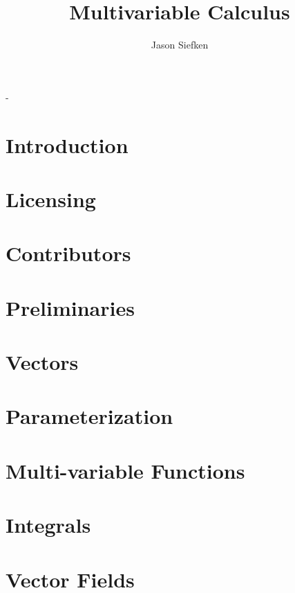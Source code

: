 \documentclass[letter, 11pt, onesided]{memoir}
\author{Jason Siefken}
\title{Multivariable Calculus}
\numberwithin{dummy}{section}
\theoremstyle{orangenumbox}
\theoremstyle{ocrenumbox}
\theoremstyle{blacknumex}
\theoremstyle{blacknumbox}
\theoremstyle{ocrenum}
\begin{document}
\frontmatter
\begin{titlingpage}
	\calccentering{\unitlength}
	\begin{adjustwidth*}{\unitlength}{-\unitlength}
		\maketitle
	\end{adjustwidth*}
\end{titlingpage}

\clearpage

\tableofcontents*
\clearpage

\chapter{Introduction}
	
\chapter{Licensing}
	
\chapter{Contributors}
	
\mainmatter

\chapter{Preliminaries}
	
	\clearpage
\chapter{Vectors}
	
	\clearpage
\chapter{Parameterization}
	
	\clearpage
\chapter{Multi-variable Functions}
	
	\clearpage
\chapter{Integrals}
	
	\clearpage
\chapter{Vector Fields}
	
	\clearpage
\end{document}
